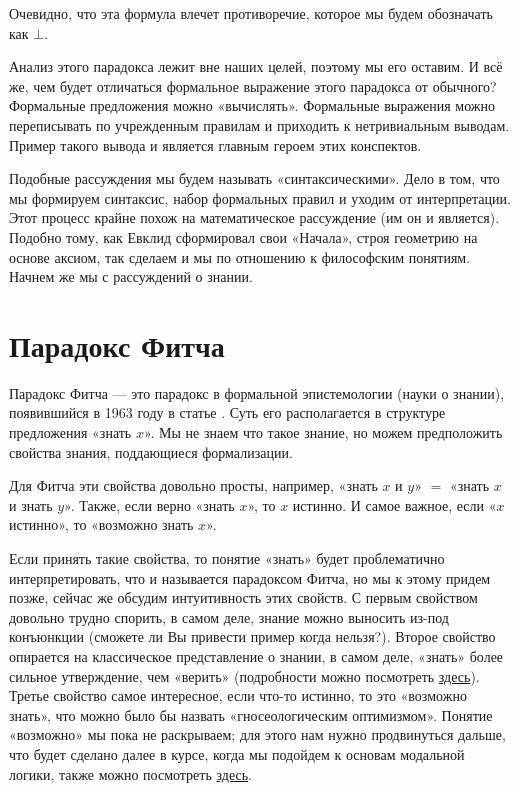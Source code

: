 \documentclass[openany]{book}
\theoremstyle{plain}
\theoremstyle{definition}
\begin{document}
\noindent Очевидно, что эта формула влечет противоречие, которое мы будем обозначать как \(\bot\).

Анализ этого парадокса лежит вне наших целей, поэтому мы его оставим. И всё же, чем будет отличаться формальное выражение этого парадокса от обычного? Формальные предложения можно «вычислять». Формальные выражения можно переписывать по учрежденным правилам и приходить к нетривиальным выводам. Пример такого вывода и является главным героем этих конспектов.

Подобные рассуждения мы будем называть «синтаксическими». Дело в том, что мы формируем синтаксис, набор формальных правил и уходим от интерпретации. Этот процесс крайне похож на математическое рассуждение (им он и является). Подобно тому, как Евклид сформировал свои «Начала», строя геометрию на основе аксиом, так сделаем и мы по отношению к философским понятиям. Начнем же мы с рассуждений о знании.

\section{Парадокс Фитча}

Парадокс Фитча — это парадокс в формальной эпистемологии (науки о знании), появившийся в 1963 году в статье \cite{Fitch}. Суть его располагается в структуре предложения «знать \(x\)». Мы не знаем что такое знание, но можем предположить свойства знания, поддающиеся формализации.

Для Фитча эти свойства довольно просты, например, «знать \(x\) и \(y\)» \(=\) «знать \(x\) и знать \(y\)». Также, если верно «знать \(x\)», то \(x\) истинно. И самое важное, если «\(x\) истинно», то «возможно знать \(x\)».

Если принять такие свойства, то понятие «знать» будет проблематично интерпретировать, что и называется парадоксом Фитча, но мы к этому придем позже, сейчас же обсудим интуитивность этих свойств. С первым свойством довольно трудно спорить, в самом деле, знание можно выносить из-под конъюнкции (сможете ли Вы привести пример когда нельзя?). Второе свойство опирается на классическое представление о знании, в самом деле, «знать» более сильное утверждение, чем «верить» (подробности можно посмотреть \href{https://plato.stanford.edu/entries/knowledge-analysis/}{здесь}). Третье свойство самое интересное, если что-то истинно, то это «возможно знать», что можно было бы назвать «гносеологическим оптимизмом». Понятие «возможно» мы пока не раскрываем; для этого нам нужно продвинуться дальше, что будет сделано далее в курсе, когда мы подойдем к основам модальной логики, также можно посмотреть \href{https://plato.stanford.edu/entries/logic-modal}{здесь}.
\end{document}
